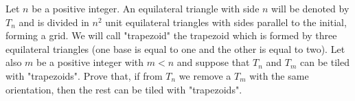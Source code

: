 Let $n$ be a positive integer. An equilateral triangle with side $n$ will be denoted by $T_n$ and is divided in $n^2$ unit equilateral triangles with sides parallel to the initial, forming a grid. We will call "trapezoid" the trapezoid which is formed by three equilateral triangles (one base is equal to one and the other is equal to two).
Let also $m$ be a positive integer with $m<n$ and suppose that $T_n$ and $T_m$ can be tiled with "trapezoids".
Prove that, if from $T_n$ we remove a $T_m$ with the same orientation, then the rest can be tiled with "trapezoids".